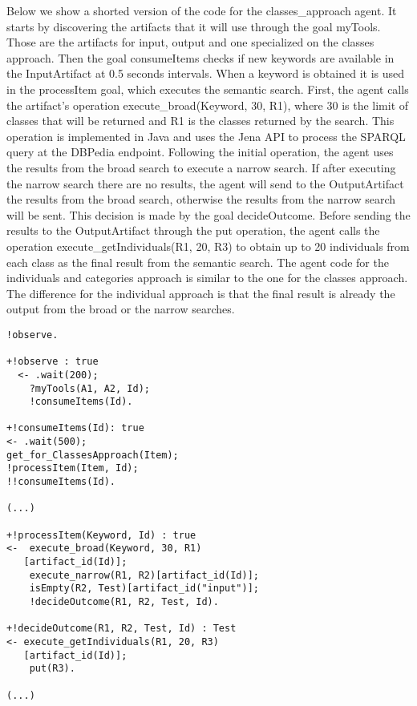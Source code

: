 \documentclass[a4paper,twoside]{article}
\begin{document}
Below we show a shorted version of the code for the classes\_approach agent. It starts by discovering the artifacts that it will use through the goal myTools. Those are the artifacts for input, output and one specialized on the classes approach. Then the goal consumeItems checks if new keywords are available in the InputArtifact at 0.5 seconds intervals. When a keyword is obtained it is used in the processItem goal, which executes the semantic search. First, the agent calls the artifact's operation execute\_broad(Keyword, 30, R1), where 30 is the limit of classes that will be returned and R1 is the classes returned by the search. This operation is implemented in Java and uses the Jena API to process the SPARQL query at the DBPedia endpoint. Following the initial operation, the agent uses the results from the broad search to execute a narrow search. If after executing the narrow search there are no results, the agent will send to the OutputArtifact the results from the broad search, otherwise the results from the narrow search will be sent. This decision is made by the goal decideOutcome. Before sending the results to the OutputArtifact through the put operation, the agent calls the operation execute\_getIndividuals(R1, 20, R3) to obtain up to 20 individuals from each class as the final result from the semantic search. The agent code for the individuals and categories approach is similar to the one for the classes approach. The difference for the individual approach is that the final result is already the output from the broad or the narrow searches.

\begin{small}
\begin{verbatim}
!observe.

+!observe : true 
  <- .wait(200); 
    ?myTools(A1, A2, Id);
    !consumeItems(Id).

+!consumeItems(Id): true
<- .wait(500);
get_for_ClassesApproach(Item);
!processItem(Item, Id);
!!consumeItems(Id).

(...)

+!processItem(Keyword, Id) : true
<-  execute_broad(Keyword, 30, R1)
   [artifact_id(Id)];
	execute_narrow(R1, R2)[artifact_id(Id)];
	isEmpty(R2, Test)[artifact_id("input")];
	!decideOutcome(R1, R2, Test, Id).	

+!decideOutcome(R1, R2, Test, Id) : Test
<- execute_getIndividuals(R1, 20, R3)
   [artifact_id(Id)];
	put(R3).

(...)
\end{verbatim}
\end{small}
\end{document}
